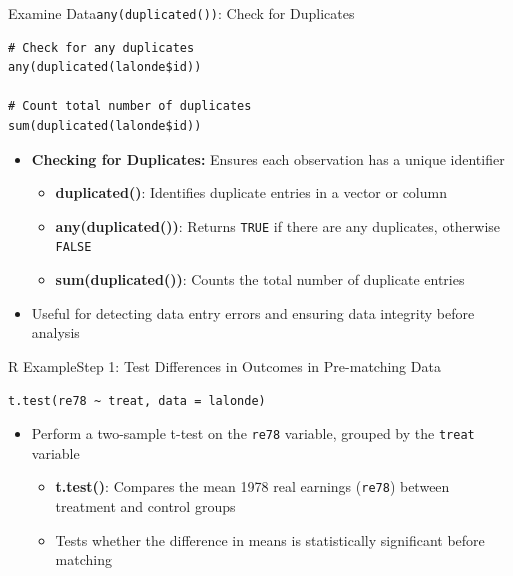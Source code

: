 \documentclass[dvipsnames,hyperref={pdfpagelabels=false}]{beamer}
\begin{document}
\begin{frame}[fragile]{Examine Data}{\texttt{any(duplicated())}: Check for Duplicates}
\begin{lstlisting}
# Check for any duplicates
any(duplicated(lalonde$id))

# Count total number of duplicates
sum(duplicated(lalonde$id))
\end{lstlisting}
\begin{itemize}
	\vspace{0.2cm}
	\item \textbf{Checking for Duplicates:} Ensures each observation has a unique identifier
	\vspace{0.2cm}
	\begin{itemize}
		\item \textbf{duplicated()}: Identifies duplicate entries in a vector or column
		\vspace{0.2cm}
		\item \textbf{any(duplicated())}: Returns \texttt{TRUE} if there are any duplicates, otherwise \texttt{FALSE}
		\vspace{0.2cm}
		\item \textbf{sum(duplicated())}: Counts the total number of duplicate entries
	\end{itemize}
	\vspace{0.2cm}
	\item Useful for detecting data entry errors and ensuring data integrity before analysis
\end{itemize}
\end{frame}


\begin{frame}[fragile]{R Example}{Step 1: Test Differences in Outcomes in Pre-matching Data}
\begin{lstlisting}
t.test(re78 ~ treat, data = lalonde)
\end{lstlisting}
\begin{itemize}
	\vspace{0.2cm}
	\item Perform a two-sample t-test on the \texttt{re78} variable, grouped by the \texttt{treat} variable
	\vspace{0.2cm}
	\begin{itemize}
		\item \textbf{t.test()}: Compares the mean 1978 real earnings (\texttt{re78}) between treatment and control groups
		\vspace{0.2cm}
		\item Tests whether the difference in means is statistically significant before matching
	\end{itemize}
\end{itemize}
\end{frame}
\end{document}

